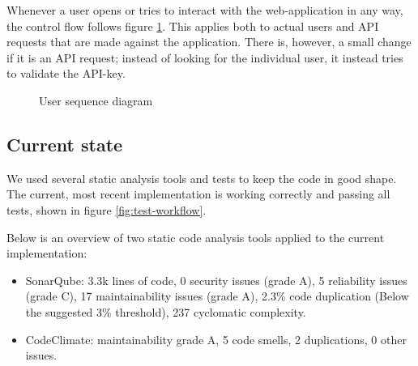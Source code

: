 

Whenever a user opens or tries to interact with the web-application in any way, the control flow follows figure \ref{fig:user-seq}. This applies both to actual users and API requests that are made against the application. There is, however, a small change if it is an API request; instead of looking for the individual user, it instead tries to validate the API-key.

\begin{figure}[h!]
  \centering
  
  \caption{User sequence diagram}
  \label{fig:user-seq}
\end{figure}


\subsection{Current state} %
We used several static analysis tools and tests to keep the
code in good shape. The current, most recent implementation
is working correctly and passing all tests, shown in figure \ref{fig:test-workflow}.

Below is an overview of two static code analysis tools applied to the current implementation:
\begin{itemize}
    \item SonarQube: 3.3k lines of code, 0 security issues (grade A), 5 reliability issues
    (grade C), 17 maintainability issues (grade A), 2.3\% code duplication
    (Below the suggested 3\% threshold), 237 cyclomatic complexity.
    \item CodeClimate: maintainability grade A, 5 code smells, 2 duplications,
    0 other issues.
\end{itemize}
